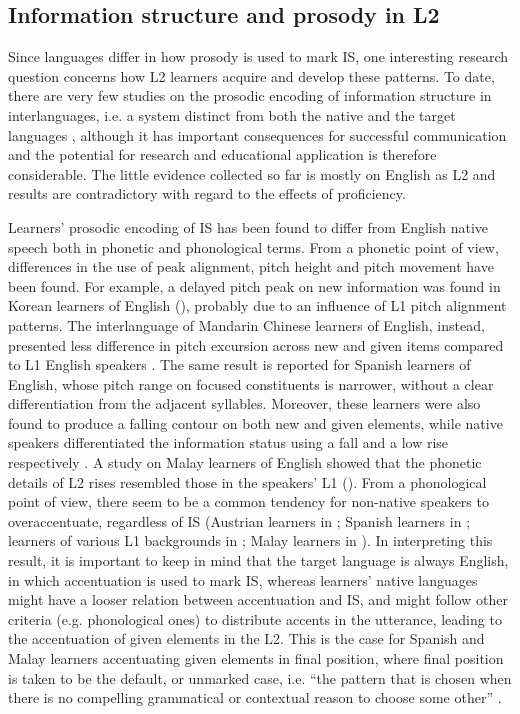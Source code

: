 \subsection{Information structure and prosody in L2}
\label{sec:2.1.6}
Since languages differ in how prosody is used to mark IS, one interesting research question concerns how L2 learners acquire and develop these patterns. To date, there are very few studies on the prosodic encoding of information structure in interlanguages, i.e. a system distinct from both the native and the target languages \citep{Selinker1972}, although it has important consequences for successful communication and the potential for research and educational application is therefore considerable. The little evidence collected so far is mostly on English as L2 and results are contradictory with regard to the effects of proficiency.

Learners’ prosodic encoding of IS has been found to differ from English native speech both in phonetic and phonological terms. From a phonetic point of view, differences in the use of peak alignment, pitch height and pitch movement have been found. For example, a delayed pitch peak on new information was found in Korean learners of English (\citealt{TrofimovichBaker2006}), probably due to an influence of L1 pitch alignment patterns. The interlanguage of Mandarin Chinese learners of English, instead, presented less difference in pitch excursion across new and given items compared to L1 English speakers \citep{Wennerstrom1998}. The same result is reported for Spanish learners of English, whose pitch range on focused constituents is narrower, without a clear differentiation from the adjacent syllables. Moreover, these learners were also found to produce a falling contour on both new and given elements, while native speakers differentiated the information status using a fall and a low rise respectively \citep{Verdugo2003}. A study on Malay learners of English showed that the phonetic details of L2 rises resembled those in the speakers’ L1 (\citealt{GutPillai2014}). From a phonological point of view, there seem to be a common tendency for non-native speakers to overaccentuate, regardless of IS (Austrian learners in \citealt{Grosser1997}; Spanish learners in \citealt{Verdugo2003}; learners of various L1 backgrounds in \citealt{Gut2009}; Malay learners in \citealt{GutPillai2014}). In interpreting this result, it is important to keep in mind that the target language is always English, in which accentuation is used to mark IS, whereas learners’ native languages might have a looser relation between accentuation and IS, and might follow other criteria (e.g. phonological ones) to distribute accents in the utterance, leading to the accentuation of given elements in the L2. This is the case for Spanish and Malay learners accentuating given elements in final position, where final position is taken to be the default, or unmarked case, i.e. “the pattern that is chosen when there is no compelling grammatical or contextual reason to choose some other” \citep[223]{Ladd2008}.

